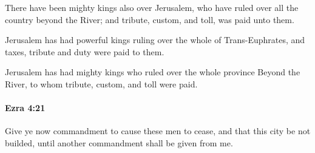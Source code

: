 			\begin{versebox}
					\item[BHS] 
					\item[LXX] 
					\item[ASV] There have been mighty kings also over Jerusalem, who have ruled over all the country beyond the River; and tribute, custom, and toll, was paid unto them.
					\item[NIV] Jerusalem has had powerful kings ruling over the whole of Trans-Euphrates, and taxes, tribute and duty were paid to them.
					\item[NRSV] Jerusalem has had mighty kings who ruled over the whole province Beyond the River, to whom tribute, custom, and toll were paid.
			\end{versebox}

		\paragraph{Ezra 4:21} %
			\label{EZRA-4-21}

			Give ye now commandment to cause these men to cease, and that this city be not builded, until another commandment shall be given from me.

